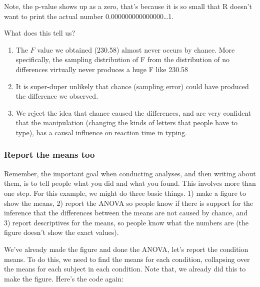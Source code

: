 \documentclass[]{book}
\theoremstyle{definition}
\theoremstyle{definition}
\theoremstyle{definition}
\theoremstyle{remark}
\begin{document}
Note, the p-value shows up as a zero, that's because it is so small that
R doesn't want to print the actual number 0.000000000000000\ldots{}1.

What does this tell us?

\begin{enumerate}
\def\labelenumi{\arabic{enumi}.}
\item
  The \(F\) value we obtained (230.58) almost never occurs by chance.
  More specifically, the sampling distribution of F from the
  distribution of no differences virtually never produces a huge F like
  230.58
\item
  It is super-duper unlikely that chance (sampling error) could have
  produced the difference we observed.
\item
  We reject the idea that chance caused the differences, and are very
  confident that the manipulation (changing the kinds of letters that
  people have to type), has a causal influence on reaction time in
  typing.
\end{enumerate}

\subsubsection{Report the means too}\label{report-the-means-too}

Remember, the important goal when conducting analyses, and then writing
about them, is to tell people what you did and what you found. This
involves more than one step. For this example, we might do three basic
things. 1) make a figure to show the means, 2) report the ANOVA so
people know if there is support for the inference that the differences
between the means are not caused by chance, and 3) report descriptives
for the means, so people know what the numbers are (the figure doesn't
show the exact values).

We've already made the figure and done the ANOVA, let's report the
condition means. To do this, we need to find the means for each
condition, collapsing over the means for each subject in each condition.
Note that, we already did this to make the figure. Here's the code
again:
\end{document}
